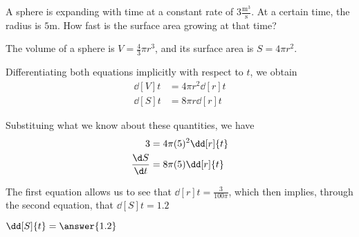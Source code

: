 \documentclass{ximera}
\author{Steven Gubkin}
\begin{document}
\begin{exercise}



A sphere is expanding with time at a constant rate of $3
\frac{\textrm{m}^3}{\textrm{s}}$.  At a certain time, the radius is $5
\textrm{m}$.  How fast is the surface area growing at that time?

\begin{hint}
  The volume of a sphere is $V = \frac{4}{3} \pi r^3$, and its surface area is $S = 4 \pi r^2$.
\end{hint}

\begin{hint}
  Differentiating  both equations implicitly with respect to $t$, we obtain
\begin{align*}
\dd[V]{t} &= 4 \pi r^2 \dd[r]{t} \\
\dd[S]{t} &= 8\pi r \dd[r]{t}
\end{align*}
\end{hint}

\begin{hint}
	Substituing what we know about these quantities, we have
\begin{align*}
3 &= 4 \pi (5)^2 \dd[r]{t} \\
\frac{\d S}{\d t} &= 8\pi (5) \dd[r]{t}
\end{align*}
\end{hint}

\begin{hint}
  The first equation allows us to see that $\dd[r]{t} =
  \frac{3}{100 \pi}$, which then implies, through the second equation,
  that $\dd[S]{t} = 1.2$
\end{hint}

\begin{prompt}
	$\dd[S]{t} = \answer{1.2}$
\end{prompt}

\end{exercise}
\end{document}
